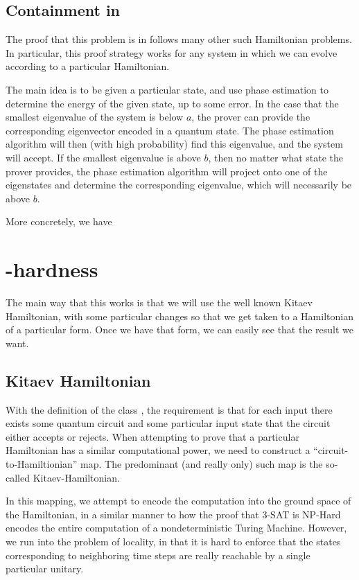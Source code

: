 \documentclass[../thesis-main/thesis-main]{subfiles}
\begin{document}
\subsection{Containment in \QMA}

The proof that this problem is in \QMA follows many other such Hamiltonian problems.  In particular, this proof strategy works for any system in which we can evolve according to a particular Hamiltonian.

The main idea is to be given a particular state, and use phase estimation to determine the energy of the given state, up to some error.  In the case that the smallest eigenvalue of the system is below $a$, the prover can provide the corresponding eigenvector encoded in a quantum state.  The phase estimation algorithm will then (with high probability) find this eigenvalue, and the system will accept.  If the smallest eigenvalue is above $b$, then no matter what state the prover provides, the phase estimation algorithm will project onto one of the eigenstates and determine the corresponding eigenvalue, which will necessarily be above $b$.

More concretely, we have 



\section{\QMA-hardness}

The main way that this works is that we will use the well known Kitaev Hamiltonian, with some particular changes so that we get taken to a Hamiltonian of a particular form.  Once we have that form, we can easily see that the result we want.

\subsection{Kitaev Hamiltonian}\label{sec:Kitaev_Hamiltonian}

With the definition of the class \QMA, the requirement is that for each input there exists some quantum circuit and some particular input state that the circuit either accepts or rejects.  When attempting to prove that a particular Hamiltonian has a similar computational power, we need to construct a ``circuit-to-Hamiltionian'' map.  The predominant (and really only) such map is the so-called Kitaev-Hamiltonian.

In this mapping, we attempt to encode the computation into the ground space of the Hamiltonian, in a similar manner to how the proof that 3-SAT is NP-Hard encodes the entire computation of a nondeterministic Turing Machine.
However, we run into the problem of locality, in that it is hard to enforce that the states corresponding to neighboring time steps are really reachable by a single particular unitary.  
\end{document}
